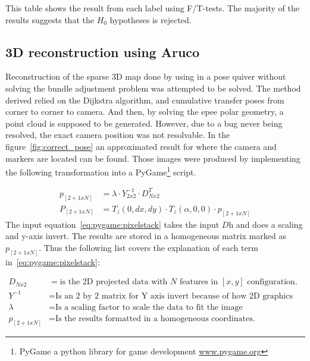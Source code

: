 \begin{table}[htb]
    \begin{center}
        
    \end{center}
    \caption[F/T-test results for labels]{This table shows the result from each label using F/T-tests. The majority of the results suggests that the $H_0$ hypotheses is rejected.}
    \label{tab:results:human}
\end{table}


\subsection{3D reconstruction using Aruco}%
Reconstruction of the sparse 3D map done by using  in a pose quiver without solving the bundle adjustment problem was attempted to be solved.
The method derived relied on the Dijkstra algorithm, and cumulative transfer poses from corner to corner to camera.
And then, by solving the epee polar geometry, a point cloud is supposed to be generated.
However, due to a bug never being resolved, the exact camera position was not resolvable.
In the figure~\ref{fig:correct_pose} an approximated result for where the camera and \aruco{ } markers are located can be found.
Those images were produced by implementing the following transformation into a PyGame\footnote{PyGame a python library for game development \url{www.pygame.org}} script.


\begin{align}
    p_{[2+1xN]} & = \lambda \cdot Y^{-1}_{2x2}\cdot D^{T}_{Nx2} \label{eq:pygame:pixelstack}\\
    P_{[2+1xN]} & = T_{z}(0,dx,dy) \cdot T_{z}(\alpha,0,0) \cdot p_{[2+1xN]} \label{eq:pygame:tf}
\end{align}
The input equation~\ref{eq:pygame:pixelstack} takes the input $D$h and does a scaling and y-axis invert.
The results are stored in a homogeneous matrix marked as $p_{[2+1xN]}$.
Thus the following list covers the explanation of each term in~\ref{eq:pygame:pixelstack}:


\begin{align*}
    D_{Nx2}   &=       \text{is the 2D projected data with $N$ features in $[x,y]$ configuration.}\\
    Y^{-1}    &=       \text{Is an 2 by 2 matrix for Y axis invert because of how 2D graphics works.}\\
    \lambda   &=      \text{Is a scaling factor to scale the data to fit the image}\\
    p_{[2+1xN]} &=      \text{Is the results formatted in a homogeneous coordinates.}
\end{align*}

